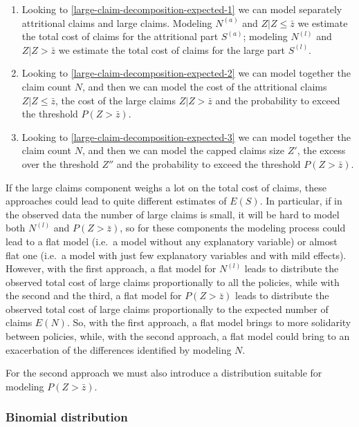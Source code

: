 \documentclass[a4paper, nobind]{templates/ociamthesis}
\providecommand{\tightlist}{%
  \setlength{\itemsep}{0pt}\setlength{\parskip}{0pt}}
\theoremstyle{definition}
\theoremstyle{definition}
\theoremstyle{definition}
\theoremstyle{remark}
\begin{document}
\begin{enumerate}
\def\labelenumi{\arabic{enumi}.}
\tightlist
\item
  Looking to \ref{large-claim-decomposition-expected-1} we can model separately attritional claims and large claims. Modeling \(N^{(a)}\) and \(Z|Z\le\bar{z}\) we estimate the total cost of claims for the attritional part \(S^{(a)}\); modeling \(N^{(l)}\) and \(Z|Z>\bar{z}\) we estimate the total cost of claims for the large part \(S^{(l)}\).
\item
  Looking to \ref{large-claim-decomposition-expected-2} we can model together the claim count \(N\), and then we can model the cost of the attritional claims \(Z|Z\le\bar{z}\), the cost of the large claims \(Z|Z>\bar{z}\) and the probability to exceed the threshold \(P(Z>\bar{z})\).
\item
  Looking to \ref{large-claim-decomposition-expected-3} we can model together the claim count \(N\), and then we can model the capped claims size \(Z'\), the excess over the threshold \(Z''\) and the probability to exceed the threshold \(P(Z>\bar{z})\).
\end{enumerate}

If the large claims component weighs a lot on the total cost of claims, these approaches could lead to quite different estimates of \(E(S)\). In particular, if in the observed data the number of large claims is small, it will be hard to model both \(N^{(l)}\) and \(P(Z>\bar{z})\), so for these components the modeling process could lead to a flat model (i.e.~a model without any explanatory variable) or almost flat one (i.e.~a model with just few explanatory variables and with mild effects). However, with the first approach, a flat model for \(N^{(l)}\) leads to distribute the observed total cost of large claims proportionally to all the policies, while with the second and the third, a flat model for \(P(Z>\bar{z})\) leads to distribute the observed total cost of large claims proportionally to the expected number of claims \(E(N)\). So, with the first approach, a flat model brings to more solidarity between policies, while, with the second approach, a flat model could bring to an exacerbation of the differences identified by modeling \(N\).

For the second approach we must also introduce a distribution suitable for modeling \(P(Z>\bar{z})\).

\hypertarget{binomial-distribution}{%
\subsubsection{Binomial distribution}\label{binomial-distribution}}
\end{document}
